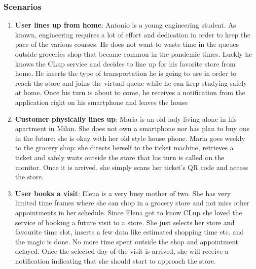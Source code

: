 \documentclass[]{article}
\begin{document}
	
		\subsubsection{Scenarios}
	
					\begin{enumerate}
						
					\item \textbf{User lines up from home}: \newline
								Antonio is a young engineering student. As known, engineering requires a lot of effort and dedication in order to keep the pace of the various courses. He does not want to waste time in the queues outside groceries shop that became common in the pandemic times. Luckly he knows the CLup service and decides to line up for his favorite store from home. \newline He inserts the type of transportation he is going to use in order to reach the store and joins the virtual queue while he can keep studying safely at home. Once his turn is about to come, he receives a notification from the application right on his smartphone and leaves the house \newline
						
					\item \textbf{Customer physically lines up}: \newline
						Maria is an old lady living alone in his apartment in Milan. She does not own a smartphone nor has plan to buy one in the future: she is okay with her old style house phone. \newline Maria goes weekly to the grocery shop: she directs herself to the ticket machine, retrieves a ticket and safely waits outside the store that his turn is called on the monitor. Once it is arrived, she simply scans her ticket's QR code and access the store. \newline
						
						
					\item \textbf{User books a visit}: \newline
						Elena is a very busy mother of two. She has very limited time frames where she can shop in a grocery store and not miss other appointments in her schedule. \newline
		Since Elena got to know CLup she loved the service of booking a future visit to a store. She just selects her store and favourite time slot, inserts a few data like estimated shopping time etc. and the magic is done. No more time spent outside the shop and appointment delayed.\newline
		Once the selected day of the visit is arrived, she will receive a notification indicating that she should start to approach the store. \newline
		

\end{enumerate}
\end{document}
